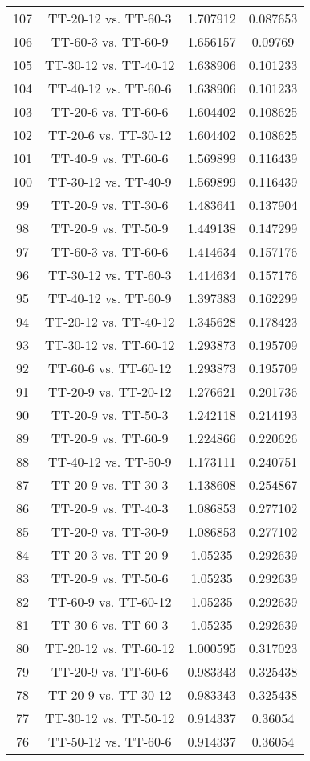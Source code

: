 \documentclass[a4paper,10pt]{article}
\begin{document}
\begin{landscape}
\begin{table}[!htp]
\begin{tabular}{cccc}
107&TT-20-12 vs. TT-60-3&1.707912&0.087653\\
106&TT-60-3 vs. TT-60-9&1.656157&0.09769\\
105&TT-30-12 vs. TT-40-12&1.638906&0.101233\\
104&TT-40-12 vs. TT-60-6&1.638906&0.101233\\
103&TT-20-6 vs. TT-60-6&1.604402&0.108625\\
102&TT-20-6 vs. TT-30-12&1.604402&0.108625\\
101&TT-40-9 vs. TT-60-6&1.569899&0.116439\\
100&TT-30-12 vs. TT-40-9&1.569899&0.116439\\
99&TT-20-9 vs. TT-30-6&1.483641&0.137904\\
98&TT-20-9 vs. TT-50-9&1.449138&0.147299\\
97&TT-60-3 vs. TT-60-6&1.414634&0.157176\\
96&TT-30-12 vs. TT-60-3&1.414634&0.157176\\
95&TT-40-12 vs. TT-60-9&1.397383&0.162299\\
94&TT-20-12 vs. TT-40-12&1.345628&0.178423\\
93&TT-30-12 vs. TT-60-12&1.293873&0.195709\\
92&TT-60-6 vs. TT-60-12&1.293873&0.195709\\
91&TT-20-9 vs. TT-20-12&1.276621&0.201736\\
90&TT-20-9 vs. TT-50-3&1.242118&0.214193\\
89&TT-20-9 vs. TT-60-9&1.224866&0.220626\\
88&TT-40-12 vs. TT-50-9&1.173111&0.240751\\
87&TT-20-9 vs. TT-30-3&1.138608&0.254867\\
86&TT-20-9 vs. TT-40-3&1.086853&0.277102\\
85&TT-20-9 vs. TT-30-9&1.086853&0.277102\\
84&TT-20-3 vs. TT-20-9&1.05235&0.292639\\
83&TT-20-9 vs. TT-50-6&1.05235&0.292639\\
82&TT-60-9 vs. TT-60-12&1.05235&0.292639\\
81&TT-30-6 vs. TT-60-3&1.05235&0.292639\\
80&TT-20-12 vs. TT-60-12&1.000595&0.317023\\
79&TT-20-9 vs. TT-60-6&0.983343&0.325438\\
78&TT-20-9 vs. TT-30-12&0.983343&0.325438\\
77&TT-30-12 vs. TT-50-12&0.914337&0.36054\\
76&TT-50-12 vs. TT-60-6&0.914337&0.36054\\

\end{tabular}
\end{table}
\end{landscape}
\end{document}
